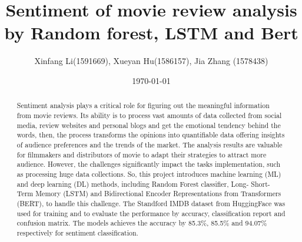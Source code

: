\documentclass[11pt]{article}
\begin{document}
\title{
Sentiment of movie review analysis by Random forest, LSTM and Bert
}

\author{
Xinfang Li(1591669), Xueyan Hu(1586157), Jia Zhang (1578438)
}
\date{\today}

\maketitle
\markboth{}{}

\begin{abstract}
Sentiment analysis plays a critical role for figuring out the meaningful information from movie reviews. Its ability is to process vast amounts of data collected from social media, review websites and personal blogs and get the emotional tendency behind the words, then, the process transforms the opinions into quantifiable data offering insights of audience preferences and the trends of the market. The analysis results are valuable for filmmakers and distributors of movie to adapt their strategies to attract more audience. However, the challenges significantly impact the tasks implementation, such as processing huge data collections. So, this project introduces machine learning (ML) and deep learning (DL) methods, including Random Forest classifier, Long- Short-Term Memory (LSTM) and Bidirectional Encoder Representations from Transformers (BERT), to handle this challenge. The Standford IMDB dataset from HuggingFace was used for training and to evaluate the performance by accuracy, classification report and confusion matrix. The models achieves the accuracy by 85.3\%, 85.5\% and 94.07\% respectively for sentiment classification.
\end{abstract}

\clearpage
\thispagestyle{empty}
\tableofcontents
\thispagestyle{empty}

\clearpage
\setcounter{page}{1}









\clearpage


\end{document}

